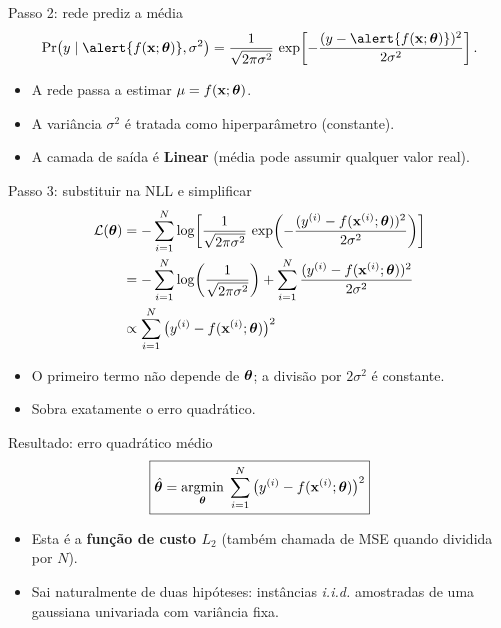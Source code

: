 \documentclass[aspectratio=169,xcolor=dvipsnames]{beamer}
\begin{document}
  \begin{frame}{Passo 2: rede prediz a média}
    \[
      \Pr\!\big(y \mid \alert{f(\mathbf{x};\thetav)},\sigma^{2}\big) =
        \frac{1}{\sqrt{2\pi\sigma^{2}}}\,
        \exp\!\left[-\frac{(y-\alert{f(\mathbf{x};\thetav)})^{2}}{2\sigma^{2}}\right].
    \]
    \begin{itemize}
      \item A rede passa a estimar $\mu = f(\mathbf{x};\bm{\theta})$.
      \item A variância $\sigma^{2}$ é tratada como hiperparâmetro (constante).
      \item A camada de saída é \textbf{Linear} (média pode assumir qualquer valor real).
    \end{itemize}
  \end{frame}

  \begin{frame}{Passo 3: substituir na NLL e simplificar}
    \begin{align*}
      \mathcal{L}(\bm{\theta})
        &= -\sum_{i=1}^{N}\log\!\left[\frac{1}{\sqrt{2\pi\sigma^{2}}}\,\exp\!\left(-\frac{(y^{(i)}-f(\mathbf{x}^{(i)};\bm{\theta}))^{2}}{2\sigma^{2}}\right)\right] \\
        &= -\sum_{i=1}^{N}\log\!\left(\frac{1}{\sqrt{2\pi\sigma^{2}}}\right) + \sum_{i=1}^{N}\frac{(y^{(i)}-f(\mathbf{x}^{(i)};\bm{\theta}))^{2}}{2\sigma^{2}} \\
        &\propto \sum_{i=1}^{N}\big(y^{(i)}-f(\mathbf{x}^{(i)};\bm{\theta})\big)^{2}
    \end{align*}
    \begin{itemize}
      \item O primeiro termo não depende de $\bm{\theta}$; a divisão por $2\sigma^{2}$ é constante.
      \item Sobra exatamente o erro quadrático.
    \end{itemize}
  \end{frame}

  \begin{frame}{Resultado: erro quadrático médio}
    \[
      \boxed{\hat{\bm{\theta}} = \operatorname*{argmin}_{\bm{\theta}}\;\sum_{i=1}^{N}\big(y^{(i)}-f(\mathbf{x}^{(i)};\bm{\theta})\big)^{2}}
    \]
    \begin{itemize}
      \item Esta é a \textbf{função de custo $L_2$} (também chamada de MSE quando dividida por $N$).
      \item Sai naturalmente de duas hipóteses: instâncias \textit{i.i.d.} amostradas de uma
        gaussiana univariada com variância fixa.
    \end{itemize}
  \end{frame}
\end{document}
